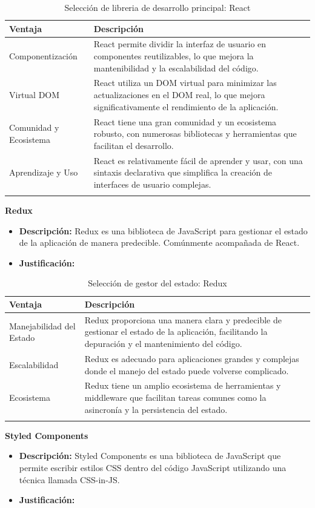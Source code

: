 \begin{longtable}{|p{3cm}|p{10cm}|}
\hline
\textbf{Ventaja} & \textbf{Descripción} \\ \hline
Componentización & React permite dividir la interfaz de usuario en componentes reutilizables, lo que mejora la mantenibilidad y la escalabilidad del código. \\ \hline
Virtual DOM & React utiliza un DOM virtual para minimizar las actualizaciones en el DOM real, lo que mejora significativamente el rendimiento de la aplicación. \\ \hline
Comunidad y Ecosistema & React tiene una gran comunidad y un ecosistema robusto, con numerosas bibliotecas y herramientas que facilitan el desarrollo. \\ \hline
Aprendizaje y Uso & React es relativamente fácil de aprender y usar, con una sintaxis declarativa que simplifica la creación de interfaces de usuario complejas. \\ \hline
\caption{Selección de libreria de desarrollo principal: React}
\end{longtable}

\textbf{Redux}
\begin{itemize}[label={}, leftmargin=0pt]
    \item \textbf{Descripción:} Redux es una biblioteca de JavaScript para gestionar el estado de la aplicación de manera predecible. Comúnmente acompañada de React.
    \item \textbf{Justificación:}
\end{itemize}

\begin{longtable}{|p{3cm}|p{10cm}|}
\hline
\textbf{Ventaja} & \textbf{Descripción} \\ \hline
Manejabilidad del Estado & Redux proporciona una manera clara y predecible de gestionar el estado de la aplicación, facilitando la depuración y el mantenimiento del código. \\ \hline
Escalabilidad & Redux es adecuado para aplicaciones grandes y complejas donde el manejo del estado puede volverse complicado. \\ \hline
Ecosistema & Redux tiene un amplio ecosistema de herramientas y middleware que facilitan tareas comunes como la asincronía y la persistencia del estado. \\ \hline
\caption{Selección de gestor del estado: Redux}
\end{longtable}

\textbf{Styled Components}
\begin{itemize}[label={}, leftmargin=0pt]
    \item \textbf{Descripción:} Styled Components es una biblioteca de JavaScript que permite escribir estilos CSS dentro del código JavaScript utilizando una técnica llamada CSS-in-JS.
    \item \textbf{Justificación:}
\end{itemize}

